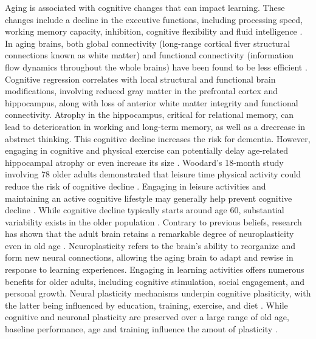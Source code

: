 Aging is associated with cognitive changes that can impact learning. These changes include a decline in the executive functions, including processing speed, working memory capacity, inhibition, cognitive flexibility and fluid intelligence \cite{Grady2012, Reuter-Lorenz2010}. In aging brains, both global connectivity (long-range cortical fiver structural connections known as white matter) and functional connectivity (information flow dynamics throughout the whole brains) have been found to be less efficient \cite{Spreng2013}. Cognitive regression correlates with local structural and functional brain modifications, involving reduced gray matter in the prefrontal cortex and hippocampus, along with loss of anterior white matter integrity and functional connectivity. Atrophy in the hippocampus, critical for relational memory, can lead to deterioration in working and long-term memory, as well as a drecrease in abstract thinking. This cognitive decline increases the risk for dementia. However, engaging in cognitive and physical exercise can potentially delay age-related hippocampal atrophy or even increase its size \cite{Erickson2011, Fotuhi2012}. Woodard's 18-month study involving 78 older adults demonstrated that  leisure time physical activity could reduce the risk of cognitive decline \cite{Woodard2012}. Engaging in leisure activities and maintaining an active cognitive lifestyle may generally help prevent cognitive decline \cite{Verghese2003}. While cognitive decline typically starts around age 60, substantial variability exists in the older population \cite{Hedden2004}. 
Contrary to previous beliefs, research has shown that the adult brain retains a remarkable degree of neuroplasticity even in old age \cite{Altenmuller2020}. Neuroplasticity refers to the brain's ability to reorganize and form new neural connections, allowing the aging brain to adapt and rewise in response to learning experiences. Engaging in learning activities offers numerous benefits for older adults, including cognitive stimulation, social engagement, and personal growth. Neural plasticity mechanisms underpin cognitive plasiticity, with the latter being influenced by education, training, exercise, and diet \cite{Greenwood2010}. While cognitive and neuronal plasticity are preserved over a large range of old age, baseline performance, age and training influence the amout of plasticity \cite{Zinke2014}.
